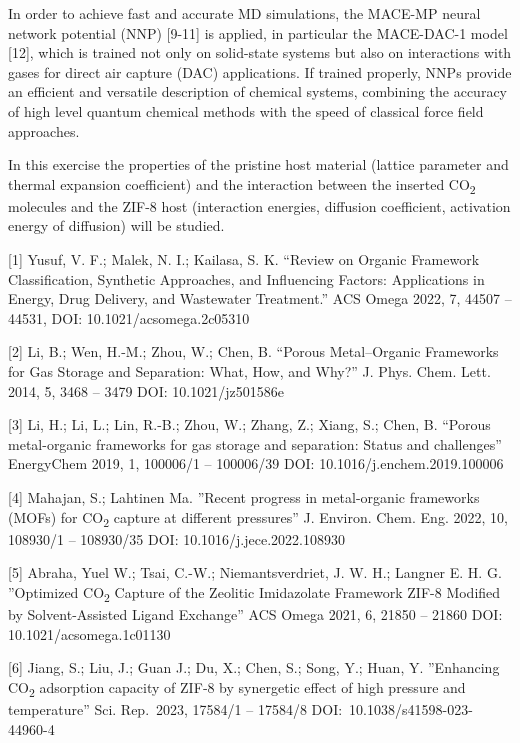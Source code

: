 \documentclass[
  letterpaper,
  DIV=11,
  numbers=noendperiod]{scrreprt}
\begin{document}
In order to achieve fast and accurate MD simulations, the MACE-MP neural
network potential (NNP) {[}9-11{]} is applied, in particular the
MACE-DAC-1 model {[}12{]}, which is trained not only on solid-state
systems but also on interactions with gases for direct air capture (DAC)
applications. If trained properly, NNPs provide an efficient and
versatile description of chemical systems, combining the accuracy of
high level quantum chemical methods with the speed of classical force
field approaches.

In this exercise the properties of the pristine host material (lattice
parameter and thermal expansion coefficient) and the interaction between
the inserted CO\textsubscript{2} molecules and the ZIF-8 host
(interaction energies, diffusion coefficient, activation energy of
diffusion) will be studied.

{[}1{]} Yusuf, V. F.; Malek, N. I.; Kailasa, S. K. ``Review on Organic
Framework Classification, Synthetic Approaches, and Influencing Factors:
Applications in Energy, Drug Delivery, and Wastewater Treatment.'' ACS
Omega 2022, 7, 44507 -- 44531, DOI: 10.1021/acsomega.2c05310

{[}2{]} Li, B.; Wen, H.-M.; Zhou, W.; Chen, B. ``Porous Metal--Organic
Frameworks for Gas Storage and Separation: What, How, and Why?'' J.
Phys. Chem. Lett. 2014, 5, 3468 -- 3479 DOI: 10.1021/jz501586e

{[}3{]} Li, H.; Li, L.; Lin, R.-B.; Zhou, W.; Zhang, Z.; Xiang, S.;
Chen, B. ``Porous metal-organic frameworks for gas storage and
separation: Status and challenges'' EnergyChem 2019, 1, 100006/1 --
100006/39 DOI: 10.1016/j.enchem.2019.100006

{[}4{]} Mahajan, S.; Lahtinen Ma. ''Recent progress in metal-organic
frameworks (MOFs) for CO\textsubscript{2} capture at different
pressures'' J. Environ. Chem. Eng. 2022, 10, 108930/1 -- 108930/35 DOI:
10.1016/j.jece.2022.108930

{[}5{]} Abraha, Yuel W.; Tsai, C.-W.; Niemantsverdriet, J. W. H.;
Langner E. H. G. ''Optimized CO\textsubscript{2} Capture of the Zeolitic
Imidazolate Framework ZIF-8 Modified by Solvent-Assisted Ligand
Exchange'' ACS Omega 2021, 6, 21850 -- 21860 DOI:
10.1021/acsomega.1c01130

{[}6{]} Jiang, S.; Liu, J.; Guan J.; Du, X.; Chen, S.; Song, Y.; Huan,
Y. ''Enhancing CO\textsubscript{2} adsorption capacity of ZIF‑8 by
synergetic effect of high pressure and temperature'' Sci. Rep.~2023,
17584/1 -- 17584/8 DOI:~10.1038/s41598-023-44960-4
\end{document}
